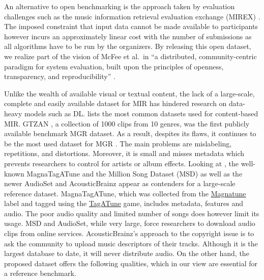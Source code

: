 \documentclass{article}
\begin{document}
An alternative to open benchmarking is the approach taken by evaluation challenges such as the music information retrieval evaluation exchange (MIREX) \cite{mirex}. The imposed constraint that input data cannot be made available to participants however incurs an approximately linear cost with the number of submissions as all algorithms have to be run by the organizers. By releasing this open dataset, we realize part of the vision of McFee et al.\ in ``a distributed, community-centric paradigm for system evaluation, built upon the principles of openness, transparency, and reproducibility'' \cite{mirex_critic}.

Unlike the wealth of available visual or textual content, the lack of a large-scale, complete and easily available dataset for MIR has hindered research on data-heavy models such as DL.
 lists the most common datasets used for content-based MIR.
GTZAN \cite{gtzan}, a collection of 1000 clips from 10 genres, was the first publicly available benchmark MGR dataset. As a result, despites its flaws, it continues to be the most used dataset for MGR \cite{mgr_eval_2}. The main problems are mislabeling, repetitions, and distortions. Moreover, it is small and misses metadata which prevents researchers to control for artists or album effects. %
Looking at , the well-known MagnaTagATune \cite{magnatagatune} and the Million Song Dataset (MSD) \cite{msd} as well as the newer AudioSet \cite{audioset} and AcousticBrainz \cite{acousticbrainz} appear as contenders for a large-scale reference dataset. %
MagnaTagATune, which was collected from the \href{https://magnatune.com/}{Magnatune} label and tagged using the \href{http://tagatune.org/}{TagATune} game, includes metadata, features and audio. The poor audio quality and limited number of songs does however limit its usage.
MSD and AudioSet, while very large, force researchers to download audio clips from online services. AcousticBrainz's approach to the copyright issue is to ask the community to upload music descriptors of their tracks. Although it is the largest database to date, it will never distribute audio.
On the other hand, the proposed dataset offers the following qualities, which in our view are essential for a reference benchmark.
\end{document}
